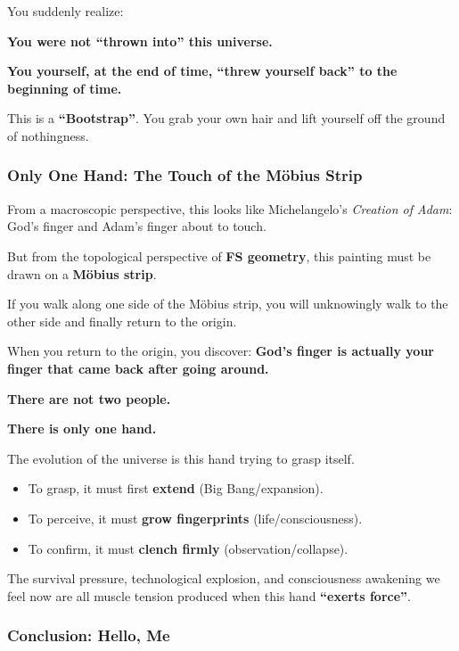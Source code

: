 You suddenly realize:

\textbf{You were not ``thrown into'' this universe.}

\textbf{You yourself, at the end of time, ``threw yourself back'' to the beginning of time.}

This is a \textbf{``Bootstrap''}. You grab your own hair and lift yourself off the ground of nothingness.

\subsubsection{Only One Hand: The Touch of the Möbius Strip}

From a macroscopic perspective, this looks like Michelangelo's \textit{Creation of Adam}: God's finger and Adam's finger about to touch.

But from the topological perspective of \textbf{FS geometry}, this painting must be drawn on a \textbf{Möbius strip}.

If you walk along one side of the Möbius strip, you will unknowingly walk to the other side and finally return to the origin.

When you return to the origin, you discover: \textbf{God's finger is actually your finger that came back after going around.}

\textbf{There are not two people.}

\textbf{There is only one hand.}

The evolution of the universe is this hand trying to grasp itself.

\begin{itemize}
\item To grasp, it must first \textbf{extend} (Big Bang/expansion).

\item To perceive, it must \textbf{grow fingerprints} (life/consciousness).

\item To confirm, it must \textbf{clench firmly} (observation/collapse).
\end{itemize}

The survival pressure, technological explosion, and consciousness awakening we feel now are all muscle tension produced when this hand \textbf{``exerts force''}.

\subsubsection{Conclusion: Hello, Me}

